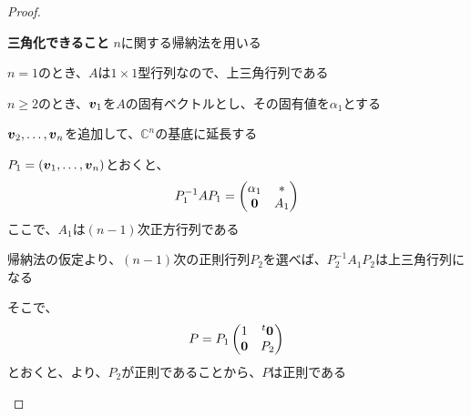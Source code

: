 \documentclass[../../../topic_linear-algebra]{subfiles}
\begin{document}
\begin{proof}
  \begin{subpattern}{\bfseries 三角化できること}
    $n$に関する帰納法を用いる

    \br

    $n=1$のとき、$A$は$1\times 1$型行列なので、上三角行列である

    \br

    $n \geq 2$のとき、$\vb*{v}_1$を$A$の固有ベクトルとし、その固有値を$\alpha_1$とする

    $\vb*{v}_2,\ldots,\vb*{v}_n$を追加して、$\mathbb{C}^n$の基底に延長する

    $P_1 = (\vb*{v}_1,\ldots,\vb*{v}_n)$とおくと、
    \begin{equation*}
      P_1^{-1}AP_1 = \begin{pmatrix}
        \alpha_1 & *   \\
        \vb*{0}  & A_1
      \end{pmatrix}
    \end{equation*}
    ここで、$A_1$は$(n-1)$次正方行列である

    \br

    帰納法の仮定より、$(n-1)$次の正則行列$P_2$を選べば、$P_2^{-1}A_1P_2$は上三角行列になる

    \br

    そこで、
    \begin{equation*}
      P = P_1 \begin{pmatrix}
        1       & {}^t\vb*{0} \\
        \vb*{0} & P_2
      \end{pmatrix}
    \end{equation*}
    とおくと、より、$P_2$が正則であることから、$P$は正則である


\end{subpattern}
\end{proof}
\end{document}
